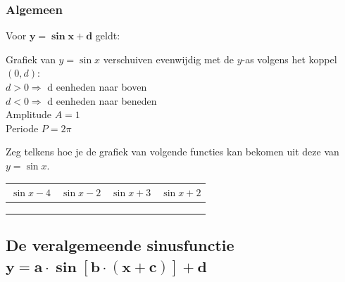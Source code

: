\documentclass[a4paper,12pt,twoside]{article}
\begin{document}
\subsubsection*{Algemeen}
\begin{mdframed}
Voor $\boldsymbol{y=\sin x+d}$ geldt:
  \begin{center}
    Grafiek van $y=\sin x$ verschuiven evenwijdig met de $y$-as volgens het koppel $(0, d)$:\\
    $d>0 \Rightarrow$ d eenheden naar boven\\
    $d<0 \Rightarrow$ d eenheden naar beneden \\
    Amplitude $A = 1$\\
    Periode $P = 2 \pi$
  \end{center}
\end{mdframed}

\begin{oefening}
Zeg telkens hoe je de grafiek van volgende functies kan bekomen uit deze van $y=\sin x$.
\begin{center}
  \begin{tabular}{c|c|c|c}
    $\sin x-4$ & $\sin x-2$ & $\sin x+3$ & $\sin x+2$\\
    \hline
    \hspace*{3cm} &\hspace*{3cm}&\hspace*{3cm}&\hspace*{3cm}\\
    &&&\\
    &&&
  \end{tabular}
\end{center}
\end{oefening}



\subsection{De veralgemeende sinusfunctie $\boldsymbol{y=a\cdot \sin[b\cdot (x+c)]+d}$}
\end{document}

